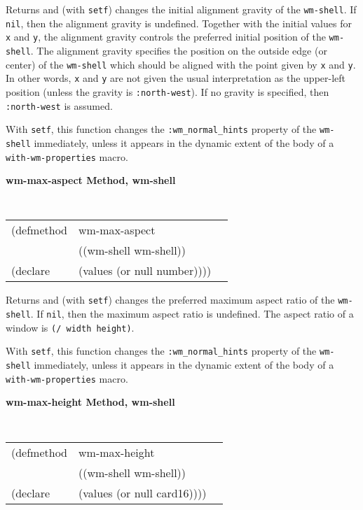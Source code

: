 \begin{flushright} \parbox[t]{6.125in}{ Returns and (with {\tt setf}) changes
the initial alignment gravity of the {\tt wm-shell}.  If {\tt nil}, then the alignment gravity
is undefined. Together with the initial values for
{\tt x} and {\tt y}, the alignment gravity controls the preferred initial
position of the {\tt wm-shell}. The alignment gravity specifies the position on
the outside edge (or center) of the {\tt wm-shell} which should be aligned with
the point given by {\tt x} and {\tt y}. In other words, {\tt x} and {\tt y} are
not given the usual interpretation as the upper-left position (unless the
gravity is {\tt :north-west}). If no gravity is specified, then {\tt
:north-west} is assumed.

With {\tt setf}, this function changes the {\tt :wm\_normal\_hints} property of
the {\tt wm-shell} immediately, unless it appears in the dynamic extent of the
body of a {\tt with-wm-properties} macro.

}\end{flushright}


{\samepage
{\large {\bf wm-max-aspect \hfill Method, wm-shell}}
\begin{flushright} \parbox[t]{6.125in}{
\tt
\begin{tabular}{lll}
\raggedright
(defmethod & wm-max-aspect & \\
           & ((wm-shell  wm-shell)) \\
(declare   & (values (or null number))))
\end{tabular}
\rm

}\end{flushright}}

\begin{flushright} \parbox[t]{6.125in}{
Returns and (with {\tt setf}) changes the preferred maximum aspect ratio of the
{\tt wm-shell}.  If {\tt nil}, then the maximum aspect ratio is undefined. The aspect ratio of a
window is {\tt (/ width height)}.  

With {\tt setf}, this function changes the {\tt :wm\_normal\_hints} property of
the {\tt wm-shell} immediately, unless it appears in the dynamic extent of the
body of a {\tt with-wm-properties} macro.

}\end{flushright}


{\samepage
{\large {\bf wm-max-height \hfill Method, wm-shell}}
\begin{flushright} \parbox[t]{6.125in}{
\tt
\begin{tabular}{lll}
\raggedright
(defmethod & wm-max-height & \\
           & ((wm-shell  wm-shell)) \\
(declare   & (values (or null card16))))
\end{tabular}
\rm

}\end{flushright}}


